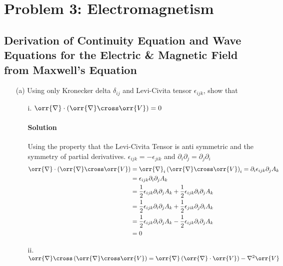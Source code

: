 \documentclass{article}
\begin{document}
{	\clearpage
	\section*{Problem 3: Electromagnetism}
	\subsection*{Derivation of Continuity Equation and Wave Equations for the Electric \& Magnetic Field from Maxwell's Equation}
	\boldmath
		\begin{enumerate}
			\item[(a)] Using only Kronecker delta $\delta_{ij}$ and Levi-Civita tensor $\epsilon_{ijk}$, show that \\
			\begin{enumerate}
				\item[i.] $ \orr{\nabla} \cdot \left( \orr{\nabla} \cross \orr{V} \right) = 0 $
				\paragraph{Solution} Using the property that the Levi-Civita Tensor is anti symmetric and the symmetry of partial derivatives. $\epsilon_{ijk} = -\epsilon_{jik}$ and $\partial_i \partial_j = \partial_j \partial_i$ \unboldmath  
				\begin{equation*}
					\begin{split}
						\orr{\nabla} \cdot \left( \orr{\nabla} \cross \orr{V} \right) &= \orr{\nabla}_i \left( \orr{\nabla} \cross \orr{V} \right)_i = \partial_i \epsilon_{ijk} \partial_j A_k \\
						&= \epsilon_{ijk} \partial_i \partial_j A_k \\
						&= \frac{1}{2} \epsilon_{ijk} \partial_i \partial_j A_k + \frac{1}{2} \epsilon_{ijk} \partial_i \partial_j A_k \\
						&= \frac{1}{2} \epsilon_{ijk} \partial_i \partial_j A_k + \frac{1}{2} \epsilon_{jik} \partial_j \partial_i A_k \\
						&= \frac{1}{2} \epsilon_{ijk} \partial_i \partial_j A_k - \frac{1}{2} \epsilon_{ijk} \partial_i \partial_j A_k \\
						&= 0 
					\end{split}
				\end{equation*} \boldmath
				\item[ii.] $ \orr{\nabla} \cross \left( \orr{\nabla} \cross \orr{V} \right) = \orr{\nabla} \left( \orr{\nabla} \cdot \orr{V} \right) -\nabla^2 \orr{V} $

\end{enumerate}
\end{enumerate}}
\end{document}

